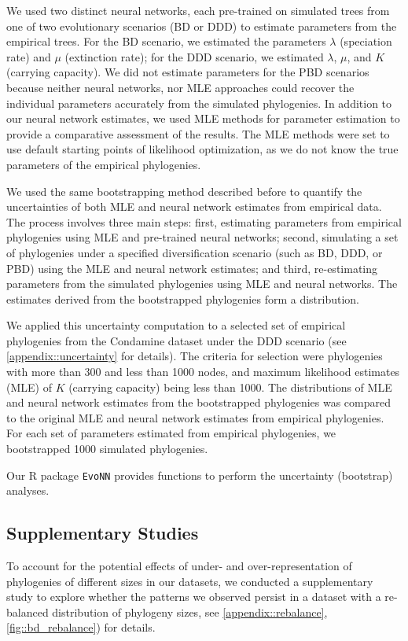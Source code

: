 {We used two distinct neural networks, each pre-trained on simulated trees from one of two evolutionary scenarios (BD or DDD) to estimate parameters from the empirical trees. For the BD scenario, we estimated the parameters $\lambda$ (speciation rate) and $\mu$ (extinction rate); for the DDD scenario, we estimated $\lambda$, $\mu$, and $K$ (carrying capacity). We did not estimate parameters for the PBD scenarios because neither neural networks, nor MLE approaches could recover the individual parameters accurately from the simulated phylogenies. In addition to our neural network estimates, we used MLE methods for parameter estimation to provide a comparative assessment of the results. The MLE methods were set to use default starting points of likelihood optimization, as we do not know the true parameters of the empirical phylogenies.

We used the same bootstrapping method described before to quantify the uncertainties of both MLE and neural network estimates from empirical data. The process involves three main steps: first, estimating parameters from empirical phylogenies using MLE and pre-trained neural networks; second, simulating a set of phylogenies under a specified diversification scenario (such as BD, DDD, or PBD) using the MLE and neural network estimates; and third, re-estimating parameters from the simulated phylogenies using MLE and neural networks. The estimates derived from the bootstrapped phylogenies form a distribution.

We applied this uncertainty computation to a selected set of empirical phylogenies from the Condamine dataset \citep{condamine_assessing_2019} under the DDD scenario (see \autoref{appendix::uncertainty} for details). The criteria for selection were phylogenies with more than 300 and less than 1000 nodes, and maximum likelihood estimates (MLE) of $K$ (carrying capacity) being less than 1000. The distributions of MLE and neural network estimates from the bootstrapped phylogenies was compared to the original MLE and neural network estimates from empirical phylogenies. For each set of parameters estimated from empirical phylogenies, we bootstrapped 1000 simulated phylogenies.

Our R package \texttt{EvoNN} \citep{qin_evonn_2024} provides functions to perform the uncertainty (bootstrap) analyses.

\subsection{Supplementary Studies}
\label{ch2::sec::results::supplementary}
To account for the potential effects of under- and over-representation of phylogenies of different sizes in our datasets, we conducted a supplementary study to explore whether the patterns we observed persist in a dataset with a re-balanced distribution of phylogeny sizes, see \autoref{appendix::rebalance}, \autoref{fig::bd_rebalance}) for details.

}
